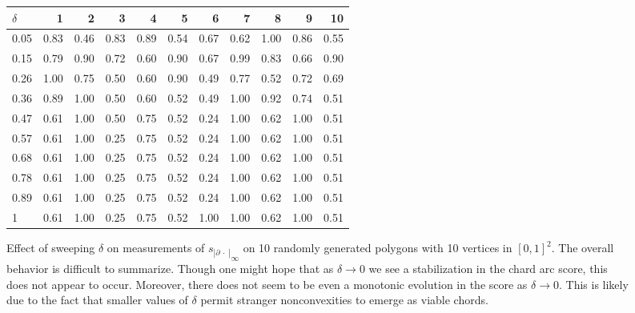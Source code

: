\documentclass[]{jocg}
\newcommand{\abs}[1]{|#1|}
\newcommand{\chordarc}{{s_{\abs{\partial~\cdot~}}}}
\theoremstyle{definition}
\theoremstyle{remark}
\begin{document}
\begin{figure}[t]
  \centering
  \begin{tabular}{lrrrrrrrrrr}
    \toprule
    $\delta$ & 1 & 2 & 3 & 4 & 5 & 6 & 7 & 8 & 9 & 10 \\
    \midrule
    0.05  &  0.83 &  0.46 &  0.83 &  0.89 &  0.54 &  0.67 &  0.62 &  1.00 &  0.86 &  0.55 \\
    0.15  &  0.79 &  0.90 &  0.72 &  0.60 &  0.90 &  0.67 &  0.99 &  0.83 &  0.66 &  0.90 \\
    0.26  &  1.00 &  0.75 &  0.50 &  0.60 &  0.90 &  0.49 &  0.77 &  0.52 &  0.72 &  0.69 \\
    0.36  &  0.89 &  1.00 &  0.50 &  0.60 &  0.52 &  0.49 &  1.00 &  0.92 &  0.74 &  0.51 \\
    0.47  &  0.61 &  1.00 &  0.50 &  0.75 &  0.52 &  0.24 &  1.00 &  0.62 &  1.00 &  0.51 \\
    0.57  &  0.61 &  1.00 &  0.25 &  0.75 &  0.52 &  0.24 &  1.00 &  0.62 &  1.00 &  0.51 \\
    0.68  &  0.61 &  1.00 &  0.25 &  0.75 &  0.52 &  0.24 &  1.00 &  0.62 &  1.00 &  0.51 \\
    0.78  &  0.61 &  1.00 &  0.25 &  0.75 &  0.52 &  0.24 &  1.00 &  0.62 &  1.00 &  0.51 \\
    0.89  &  0.61 &  1.00 &  0.25 &  0.75 &  0.52 &  0.24 &  1.00 &  0.62 &  1.00 &  0.51 \\
    1     &  0.61 &  1.00 &  0.25 &  0.75 &  0.52 &  1.00 &  1.00 &  0.62 &  1.00 &  0.51 \\
    \bottomrule
  \end{tabular}
  \caption{%
    Effect of sweeping $\delta$ on measurements of ${\chordarc}_\infty$ on
    10 randomly generated polygons with 10 vertices in $[0,1]^2$. The overall behavior is
    difficult to summarize.  Though one might hope that as $\delta \to 0$ we see
    a stabilization in the chard arc score, this does not appear to occur.
    Moreover, there does not seem to be even a monotonic evolution in the score
    as $\delta \to 0$. This is likely due to the fact that smaller values of
    $\delta$ permit stranger nonconvexities to emerge as viable chords.
  }
  \label{fig:delta-arc}
\end{figure}
\end{document}
